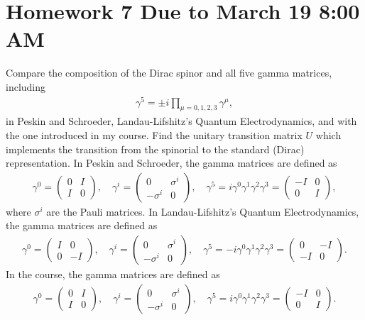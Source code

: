 \section*{Homework 7 Due to March 19 8:00 AM}
Compare the composition of the Dirac spinor and all five gamma matrices, including 
\begin{align}
    \gamma^5 = \pm i \prod_{\mu=0,1,2,3} \gamma^\mu,
\end{align}
in Peskin and Schroeder, Landau-Lifshitz’s Quantum Electrodynamics, and with the one introduced in my course. Find the unitary transition matrix $U$ which implements the transition from the spinorial to the standard (Dirac) representation.
\answer{}
In Peskin and Schroeder, the gamma matrices are defined as
\begin{align}
    \gamma^0 = \begin{pmatrix}
        0 & I \\
        I & 0
    \end{pmatrix}, \quad
    \gamma^i = \begin{pmatrix}
        0 & \sigma^i \\
        -\sigma^i & 0
    \end{pmatrix}, \quad
    \gamma^5 = i\gamma^0\gamma^1\gamma^2\gamma^3 = \begin{pmatrix}
        -I & 0 \\
        0 & I
    \end{pmatrix},
\end{align}
where $\sigma^i$ are the Pauli matrices. In Landau-Lifshitz’s Quantum Electrodynamics, the gamma matrices are defined as
\begin{align}
    \gamma^0 = \begin{pmatrix}
        I & 0 \\
        0 & -I
    \end{pmatrix}, \quad
    \gamma^i = \begin{pmatrix}
        0 & \sigma^i \\
        -\sigma^i & 0
    \end{pmatrix}, \quad
    \gamma^5 = -i\gamma^0\gamma^1\gamma^2\gamma^3 = \begin{pmatrix}
        0 & -I \\
        -I & 0
    \end{pmatrix}.
\end{align}
In the course, the gamma matrices are defined as
\begin{align}
    \gamma^0 = \begin{pmatrix}
        0 & I \\
        I & 0
    \end{pmatrix}, \quad
    \gamma^i = \begin{pmatrix}
        0 & \sigma^i \\
        -\sigma^i & 0
    \end{pmatrix}, \quad
    \gamma^5 = i\gamma^0\gamma^1\gamma^2\gamma^3 = \begin{pmatrix}
        -I & 0 \\
        0 & I
    \end{pmatrix}.
\end{align}
